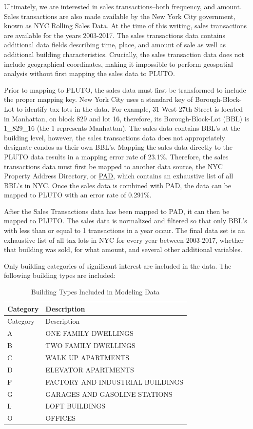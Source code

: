 \documentclass[]{article}
\begin{document}
Ultimately, we are interested in sales transactions--both frequency, and
amount. Sales transactions are also made available by the New York City
government, known as
\href{http://www1.nyc.gov/site/finance/taxes/property-annualized-sales-update.page}{NYC
Rolling Sales Data}. At the time of this writing, sales transactions are
available for the years 2003-2017. The sales transactions data contains
additional data fields describing time, place, and amount of sale as
well as additional building characteristics. Crucially, the sales
transaction data does not include geographical coordinates, making it
impossible to perform geospatial analysis without first mapping the
sales data to PLUTO.

Prior to mapping to PLUTO, the sales data must first be transformed to
include the proper mapping key. New York City uses a standard key of
Borough-Block-Lot to identify tax lots in the data. For example, 31 West
27th Street is located in Manhattan, on block 829 and lot 16, therefore,
its Borough-Block-Lot (BBL) is 1\_829\_16 (the 1 represents Manhattan).
The sales data contains BBL's at the building level, however, the sales
transactions data does not appropriately designate condos as their own
BBL's. Mapping the sales data directly to the PLUTO data results in a
mapping error rate of 23.1\%. Therefore, the sales transactions data
must first be mapped to another data source, the NYC Property Address
Directory, or
\href{https://data.cityofnewyork.us/City-Government/Property-Address-Directory/bc8t-ecyu/data}{PAD},
which contains an exhaustive list of all BBL's in NYC. Once the sales
data is combined with PAD, the data can be mapped to PLUTO with an error
rate of 0.291\%.

After the Sales Transactions data has been mapped to PAD, it can then be
mapped to PLUTO. The sales data is normalized and filtered so that only
BBL's with less than or equal to 1 transactions in a year occur. The
final data set is an exhaustive list of all tax lots in NYC for every
year between 2003-2017, whether that building was sold, for what amount,
and several other additional variables.

Only building categories of significant interest are included in the
data. The following building types are included:

\begin{longtable}[]{@{}ll@{}}
\caption{Building Types Included in Modeling Data}\tabularnewline
\toprule
Category & Description\tabularnewline
\midrule
\endfirsthead
\toprule
Category & Description\tabularnewline
\midrule
\endhead
A & ONE FAMILY DWELLINGS\tabularnewline
B & TWO FAMILY DWELLINGS\tabularnewline
C & WALK UP APARTMENTS\tabularnewline
D & ELEVATOR APARTMENTS\tabularnewline
F & FACTORY AND INDUSTRIAL BUILDINGS\tabularnewline
G & GARAGES AND GASOLINE STATIONS\tabularnewline
L & LOFT BUILDINGS\tabularnewline
O & OFFICES\tabularnewline
\bottomrule
\end{longtable}
\end{document}
